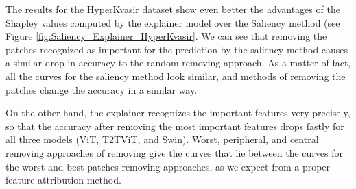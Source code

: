 \documentclass[en]{pracamgr}
\begin{document}
The results for the HyperKvasir dataset show even better the advantages of the Shapley values computed by the explainer model over the Saliency method (see Figure \ref{fig:Saliency_Explainer_HyperKvasir}. We can see that removing the patches recognized as important for the prediction by the saliency method causes a similar drop in accuracy to the random removing approach. As a matter of fact, all the curves for the saliency method look similar, and methods of removing the patches change the accuracy in a similar way.

On the other hand, the explainer recognizes the important features very precisely, so that the accuracy after removing the most important features drops fastly for all three models (ViT, T2T\textunderscore ViT, and Swin). Worst, peripheral, and central removing approaches of removing give the curves that lie between the curves for the worst and best patches removing approaches, as we expect from a proper feature attribution method.
\end{document}
